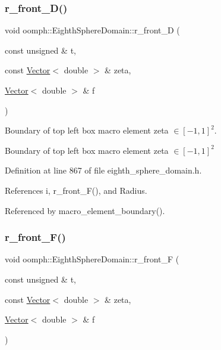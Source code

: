 \subsubsection{\texorpdfstring{r\+\_\+front\+\_\+\+D()}{r\_front\_D()}}
{\footnotesize\ttfamily void oomph\+::\+Eighth\+Sphere\+Domain\+::r\+\_\+front\+\_\+D (\begin{DoxyParamCaption}\item[{const unsigned \&}]{t,  }\item[{const \hyperlink{classoomph_1_1Vector}{Vector}$<$ double $>$ \&}]{zeta,  }\item[{\hyperlink{classoomph_1_1Vector}{Vector}$<$ double $>$ \&}]{f }\end{DoxyParamCaption})\hspace{0.3cm}{\ttfamily [private]}}



Boundary of top left box macro element zeta $ \in [-1,1]^2 $. 

Boundary of top left box macro element zeta $ \in [-1,1]^2 $ 

Definition at line 867 of file eighth\+\_\+sphere\+\_\+domain.\+h.



References i, r\+\_\+front\+\_\+\+F(), and Radius.



Referenced by macro\+\_\+element\+\_\+boundary().

\mbox{\label{classoomph_1_1EighthSphereDomain_a71d48567ee2661821f41dd50793a6eb1}} 
\subsubsection{\texorpdfstring{r\+\_\+front\+\_\+\+F()}{r\_front\_F()}}
{\footnotesize\ttfamily void oomph\+::\+Eighth\+Sphere\+Domain\+::r\+\_\+front\+\_\+F (\begin{DoxyParamCaption}\item[{const unsigned \&}]{t,  }\item[{const \hyperlink{classoomph_1_1Vector}{Vector}$<$ double $>$ \&}]{zeta,  }\item[{\hyperlink{classoomph_1_1Vector}{Vector}$<$ double $>$ \&}]{f }\end{DoxyParamCaption})\hspace{0.3cm}{\ttfamily [private]}}



